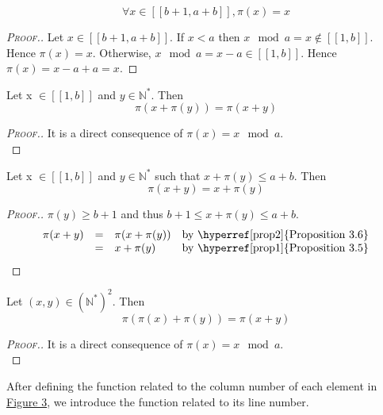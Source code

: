 \begin{proposition}
\label{prop1}
\[
\forall x \in [\![b + 1, a + b]\!], \pi(x) = x
\]
\end{proposition}

\begin{proof}[\textsc{Proof.}]
\begin{sloppypar}
Let \(x \in [\![b + 1, a + b]\!]\). If \(x < a\) then \(x \mod a = x \notin [\![1, b]\!]\). Hence \(\pi(x) = x\).
Otherwise, \({x \mod a = x - a \in [\![1, b]\!]}\). Hence \({\pi(x) = x - a + a = x}\).
\end{sloppypar}
\end{proof}

\begin{proposition}
\label{prop2}
Let x \(\in [\![1,b]\!]\) and \(y \in \mathbb{N}^*\). Then
\[
\pi(x+\pi(y)) = \pi(x+y)
\]
\end{proposition}

\begin{proof}[\textsc{Proof.}]
It is a direct consequence of \(\pi(x) = x \mod a\). \\
\end{proof}

\begin{proposition}
\label{prop3}
Let x \(\in [\![1,b]\!]\) and \(y \in \mathbb{N}^*\) such that \(x+\pi(y) \leqslant a+b\). Then
\[
\pi(x+y)=x+\pi(y)
\]
\end{proposition}

\begin{proof}[\textsc{Proof.}]
\(\pi(y) \geqslant b + 1\) and thus \(b + 1 \leqslant x + \pi(y) \leqslant a + b\).
\[
\begin{array}{l l l l}
	\pi(x + y) & = & \pi(x + \pi(y)) & \text{by \hyperref[prop2]{Proposition 3.6}} \\
	 & = & x + \pi(y) & \text{by \hyperref[prop1]{Proposition 3.5}}
\end{array}
\]
\end{proof}

\begin{proposition}
\label{prop4}
Let \((x,y)\in (\mathbb{N}^*)^2\). Then
\[
\pi(\pi(x)+\pi(y))=\pi(x+y)
\]
\end{proposition}

\begin{proof}[\textsc{Proof.}]
It is a direct consequence of \(\pi(x) = x \mod a\). \\
\end{proof}

After defining the function related to the column number of each element in \hyperref[SchemaWS]{Figure 3},
we introduce the function related to its line number.

